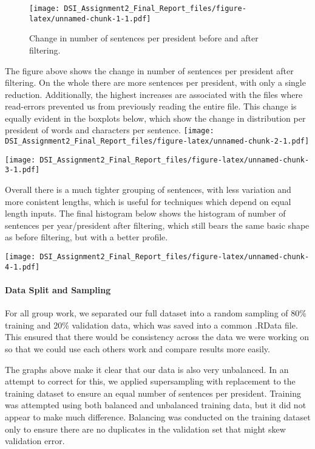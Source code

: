 \documentclass[]{article}
\let\oldparagraph\paragraph
\renewcommand{\paragraph}[1]{\oldparagraph{#1}\mbox{}}
\begin{document}
\begin{figure}
\centering
\texttt{[image: DSI\_Assignment2\_Final\_Report\_files/figure-latex/unnamed-chunk-1-1.pdf]}
\caption{Change in number of sentences per president before and after
filtering.}
\end{figure}

The figure above shows the change in number of sentences per president
after filtering. On the whole there are more sentences per president,
with only a single reduction. Additionally, the highest increases are
associated with the files where read-errors prevented us from previously
reading the entire file. This change is equally evident in the boxplots
below, which show the change in distribution per president of words and
characters per sentence.
\texttt{[image: DSI\_Assignment2\_Final\_Report\_files/figure-latex/unnamed-chunk-2-1.pdf]}

\texttt{[image: DSI\_Assignment2\_Final\_Report\_files/figure-latex/unnamed-chunk-3-1.pdf]}

Overall there is a much tighter grouping of sentences, with less
variation and more conistent lengths, which is useful for techniques
which depend on equal length inputs. The final histogram below shows the
histogram of number of sentences per year/president after filtering,
which still bears the same basic shape as before filtering, but with a
better profile.

\texttt{[image: DSI\_Assignment2\_Final\_Report\_files/figure-latex/unnamed-chunk-4-1.pdf]}

\hypertarget{data-split-and-sampling}{%
\paragraph{Data Split and Sampling}\label{data-split-and-sampling}}

For all group work, we separated our full dataset into a random sampling
of 80\% training and 20\% validation data, which was saved into a common
.RData file. This ensured that there would be consistency across the
data we were working on so that we could use each others work and
compare results more easily.

The graphs above make it clear that our data is also very unbalanced. In
an attempt to correct for this, we applied supersampling with
replacement to the training dataset to ensure an equal number of
sentences per president. Training was attempted using both balanced and
unbalanced training data, but it did not appear to make much difference.
Balancing was conducted on the training dataset only to ensure there are
no duplicates in the validation set that might skew validation error.
\end{document}
